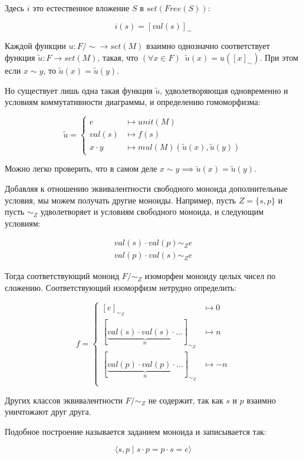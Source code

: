 \documentclass[10pt, a4paper]{article}
\theoremstyle{colon}
\begin{document}
Здесь \( i \) это естественное вложение \( S \) в \( set(Free(S)) \):

\[
i(s) = [val(s)]_\sim
\]

Каждой функции \( u : F/{\sim} \to set(M) \) взаимно однозначно соответствует
функция \( \tilde u : F \to set(M) \), такая, что \( (\forall x \in F)\enspace \tilde u(x) = u([x]_\sim) \).
При этом если \( x \sim y \), то \( \tilde u(x) = \tilde u(y) \).

Но существует лишь одна такая функция \( \tilde u \), удволетворяющая одновременно и
условиям коммутативности диаграммы, и определению гомоморфизма:

\[
\tilde u = \begin{cases}
e &\mapsto unit(M) \\
val(s) &\mapsto f(s) \\
x \cdot y &\mapsto mul(M)(\tilde u(x), \tilde u(y))
\end{cases}
\]

Можно легко проверить, что в самом деле \( x \sim y \implies \tilde u(x) = \tilde u(y) \).

Добавляя к отношению эквивалентности свободного моноида дополнительные условия, мы можем получать
другие моноиды. Например, пусть \( Z = \{s, p\} \) и пусть \( \sim_Z \)
удволетворяет и условиям свободного моноида, и следующим условиям:

\begin{align*}
val(s) \cdot val(p) \sim_Z e \\
val(p) \cdot val(s) \sim_Z e
\end{align*}

Тогда соответствующий моноид \( F/{\sim_Z} \) изоморфен моноиду целых чисел по сложению.
Соответствующий изоморфизм нетрудно определить:

\[
f = \begin{cases}
[e]_{\sim_Z} &\mapsto 0 \\
[\underbrace{val(s) \cdot val(s) \cdot \dots}_n]_{\sim_Z} &\mapsto n \\
[\underbrace{val(p) \cdot val(p) \cdot \dots}_n]_{\sim_Z} &\mapsto -n \\
\end{cases}
\]

Других классов эквивалентности \( F/{\sim_Z} \) не содержит,
так как \( s \) и \( p \) взаимно уничтожают друг друга.

Подобное построение называется заданием моноида и записывается так:

\[\langle s, p \mid s \cdot p = p \cdot s = e \rangle\]
\end{document}
